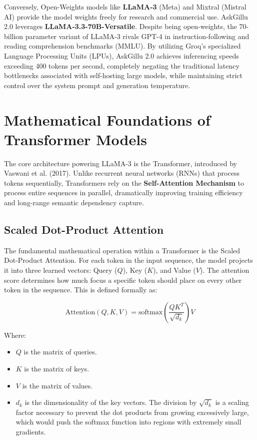 \documentclass[12pt,a4paper]{report}
\begin{document}
Conversely, Open-Weights models like \textbf{LLaMA-3} (Meta) and Mixtral (Mistral AI) provide the model weights freely for research and commercial use. AskGillu 2.0 leverages \textbf{LLaMA-3.3-70B-Versatile}. Despite being open-weights, the 70-billion parameter variant of LLaMA-3 rivals GPT-4 in instruction-following and reading comprehension benchmarks (MMLU). By utilizing Groq's specialized Language Processing Units (LPUs), AskGillu 2.0 achieves inferencing speeds exceeding 400 tokens per second, completely negating the traditional latency bottlenecks associated with self-hosting large models, while maintaining strict control over the system prompt and generation temperature.

\section{Mathematical Foundations of Transformer Models}
The core architecture powering LLaMA-3 is the Transformer, introduced by Vaswani et al. (2017). Unlike recurrent neural networks (RNNs) that process tokens sequentially, Transformers rely on the \textbf{Self-Attention Mechanism} to process entire sequences in parallel, dramatically improving training efficiency and long-range semantic dependency capture.

\subsection{Scaled Dot-Product Attention}
The fundamental mathematical operation within a Transformer is the Scaled Dot-Product Attention. For each token in the input sequence, the model projects it into three learned vectors: Query ($Q$), Key ($K$), and Value ($V$). The attention score determines how much focus a specific token should place on every other token in the sequence. This is defined formally as:

\begin{equation}
    \text{Attention}(Q, K, V) = \text{softmax}\left(\frac{QK^T}{\sqrt{d_k}}\right)V
\end{equation}

Where:
\begin{itemize}
    \item $Q$ is the matrix of queries.
    \item $K$ is the matrix of keys.
    \item $V$ is the matrix of values.
    \item $d_k$ is the dimensionality of the key vectors. The division by $\sqrt{d_k}$ is a scaling factor necessary to prevent the dot products from growing excessively large, which would push the softmax function into regions with extremely small gradients.
\end{itemize}
\end{document}
